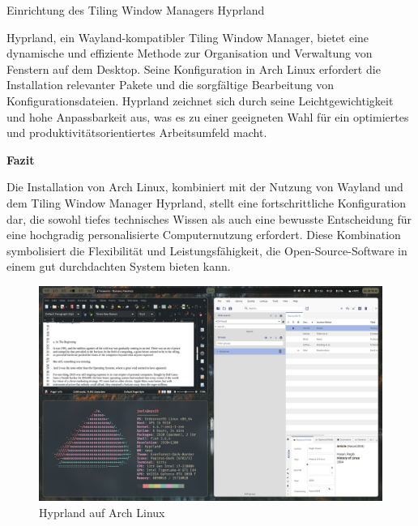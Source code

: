 Einrichtung des Tiling Window Managers Hyprland

Hyprland, ein Wayland-kompatibler Tiling Window Manager, bietet eine dynamische
und effiziente Methode zur Organisation und Verwaltung von Fenstern auf dem
Desktop. Seine Konfiguration in Arch Linux erfordert die Installation relevanter
Pakete und die sorgfältige Bearbeitung von Konfigurationsdateien. Hyprland
zeichnet sich durch seine Leichtgewichtigkeit und hohe Anpassbarkeit aus, was es
zu einer geeigneten Wahl für ein optimiertes und produktivitätsorientiertes
Arbeitsumfeld macht.

\textbf{Fazit}

Die Installation von Arch Linux, kombiniert mit der Nutzung von Wayland und dem
Tiling Window Manager Hyprland, stellt eine fortschrittliche Konfiguration dar,
die sowohl tiefes technisches Wissen als auch eine bewusste Entscheidung für
eine hochgradig personalisierte Computernutzung erfordert. Diese Kombination
symbolisiert die Flexibilität und Leistungsfähigkeit, die Open-Source-Software
in einem gut durchdachten System bieten kann.

\begin{figure}[hbt]
    \centering
    \begin{minipage}[t]{1\textwidth}
        \caption{Hyprland auf Arch Linux}
        \includegraphics[width=1\textwidth]{img/hyprland-arch}
    \end{minipage}
\end{figure}

